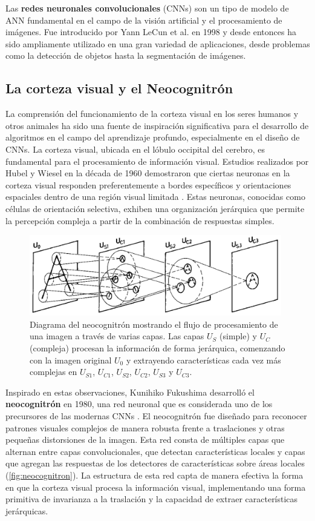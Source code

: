 Las \textbf{redes neuronales convolucionales} (CNNs) son un tipo de modelo de ANN fundamental en el campo de la visión artificial y el procesamiento de imágenes. Fue introducido por Yann LeCun et al. en 1998 y desde entonces ha sido ampliamente utilizado en una gran variedad de aplicaciones, desde problemas como la detección de objetos hasta la segmentación de imágenes.

\subsection{La corteza visual y el Neocognitrón}

La comprensión del funcionamiento de la corteza visual en los seres humanos y otros animales ha sido una fuente de inspiración significativa para el desarrollo de algoritmos en el campo del aprendizaje profundo, especialmente en el diseño de CNNs. La corteza visual, ubicada en el lóbulo occipital del cerebro, es fundamental para el procesamiento de información visual. Estudios realizados por Hubel y Wiesel en la década de 1960 demostraron que ciertas neuronas en la corteza visual responden preferentemente a bordes específicos y orientaciones espaciales dentro de una región visual limitada \cite{hubel1962receptive}. Estas neuronas, conocidas como células de orientación selectiva, exhiben una organización jerárquica que permite la percepción compleja a partir de la combinación de respuestas simples.

\begin{figure}\label{fig:neocognitron}
	\centering
	\includegraphics[width=110mm]{img/neocognitron.png}
	\caption{Diagrama del neocognitrón mostrando el flujo de procesamiento de una imagen a través de varias capas. Las capas \(U_{S}\) (simple) y \(U_{C}\) (compleja) procesan la información de forma jerárquica, comenzando con la imagen original \(U_0\) y extrayendo características cada vez más complejas en \(U_{S1}\), \(U_{C1}\), \(U_{S2}\), \(U_{C2}\), \(U_{S3}\) y \(U_{C3}\).}
\end{figure}

Inspirado en estas observaciones, Kunihiko Fukushima desarrolló el \textbf{neocognitrón} en 1980, una red neuronal que es considerada uno de los precursores de las modernas CNNs \cite{fukushima1980neocognitron}. El neocognitrón fue diseñado para reconocer patrones visuales complejos de manera robusta frente a traslaciones y otras pequeñas distorsiones de la imagen. Esta red consta de múltiples capas que alternan entre capas convolucionales, que detectan características locales y capas que agregan las respuestas de los detectores de características sobre áreas locales (\autoref{fig:neocognitron}). La estructura de esta red capta de manera efectiva la forma en que la corteza visual procesa la información visual, implementando una forma primitiva de invarianza a la traslación y la capacidad de extraer características jerárquicas.

